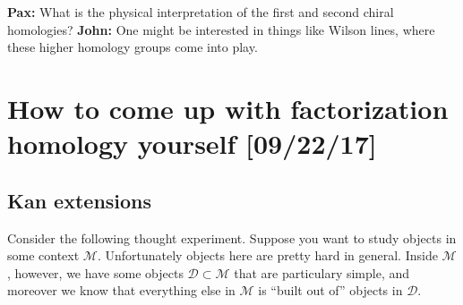 \documentclass{amsart}
\begin{document}
\textbf{Pax:} What is the physical interpretation of the first and second chiral
homologies? \textbf{John:} One might be interested in things like Wilson lines,
where these higher homology groups come into play.


\newpage
\section{How to come up with factorization homology yourself [09/22/17]}

\subsection{Kan extensions}

Consider the following
thought experiment. Suppose you want to study objects in some context $\mathcal{M}$.
Unfortunately objects here are pretty hard in general. Inside $\mathcal{M}$, however,
we have some objects $\mathcal{D}\subset \mathcal{M}$ that are particulary simple,
and moreover we know that everything else in $\mathcal{M}$ is ``built out of'' objects in $\mathcal{D}$.
\end{document}
